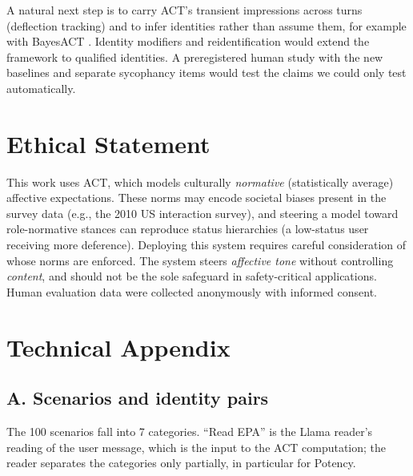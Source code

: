 \documentclass[letterpaper]{article} %
\begin{document}
A natural next step is to carry ACT's transient impressions across turns (deflection tracking) and to infer identities rather than assume them, for example with BayesACT \citep{hoey2013bayesact, schroeder2016modelling}. Identity modifiers and reidentification \citep{averett1987modified, mackinnonheise2010self} would extend the framework to qualified identities. A preregistered human study with the new baselines and separate sycophancy items would test the claims we could only test automatically.

\section*{Ethical Statement}

This work uses ACT, which models culturally \textit{normative} (statistically average) affective expectations. These norms may encode societal biases present in the survey data (e.g., the 2010 US interaction survey), and steering a model toward role-normative stances can reproduce status hierarchies (a low-status user receiving more deference). Deploying this system requires careful consideration of whose norms are enforced. The system steers \textit{affective tone} without controlling \textit{content}, and should not be the sole safeguard in safety-critical applications. Human evaluation data were collected anonymously with informed consent.




\appendix
\section*{Technical Appendix}

\subsection*{A. Scenarios and identity pairs}

The 100 scenarios fall into 7 categories. ``Read EPA'' is the Llama reader's reading of the user message, which is the input to the ACT computation; the reader separates the categories only partially, in particular for Potency.

\begin{table}[h]
\centering
\caption{Scenario categories with the mean read EPA of the user message (Llama reader).}
\label{tab:design_scn}
\small

\end{table}
\end{document}

